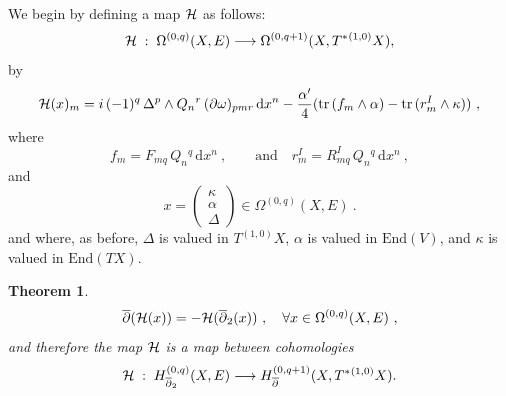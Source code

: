 \documentclass[12pt,a4paper]{article}
\def\bar#1{\overline{#1}}
\let\p=\partial
\def\a{\alpha'}
\def\d{\textrm{d}}
\def\End{\textrm{End}}
\def\bp{\bar{\partial}}
\def\tr{\textrm{tr}}
\newtheorem{Theorem}{Theorem}
\theoremstyle{definition}
\begin{document}
We begin by defining a map $\cal H$ as follows:
\begin{equation}
{\cal H}\;:\;\Omega^{(0,q)}(X, E)\longrightarrow\Omega^{(0,q+1)}(X, T^*{}^{(1,0)}X),\label{eq:mapH}
\end{equation}
by
\begin{equation}
{\cal H}(x)_m= i\, (-1)^q\, \Delta^p\wedge Q_{n}{}^r\,(\p\omega)_{pmr}\, \d x^n-\frac{\a}{4}(\tr\,(f_m\wedge \alpha)-\tr\,(r_m^I\wedge \kappa))~,\label{eq:Hdef}
\end{equation}
where
\[ f_m = F_{mq}\,Q_{n}{}^q\,\d x^n~, \qquad\text{and}\quad r_m^I = R^I_{mq}\, Q_{n}{}^q\,\d x^n~,\]
and 
\begin{equation*}
x=\left(
\begin{array}{c}
\kappa\\ \alpha\\ \Delta
\end{array}
\right)
\in\Omega^{(0,q)}(X,E)~.
\end{equation*} 
and where, as before, $\Delta$ is valued in $T^{(1,0)}X$,  $\alpha$ is valued in $\End(V)$, and $\kappa$ is valued in $\End(TX)$.

\begin{Theorem}\label{prop:five}
\begin{equation}
\bp({\cal H}(x)) = - {\cal H}(\bp_2(x))~,\quad\forall x\in \Omega^{(0,q)}(X,E)~, 
\label{eq:Hcohom} 
\end{equation}
and therefore the map $\cal H$ is a map between cohomologies
\begin{equation}
{\cal H}\;:\;H_{\bp_2}^{(0,q)}(X, E)\longrightarrow H_{\bp}^{(0,q+1)}(X, T^*{}^{(1,0)}X).\label{eq:mapHcohom}
\end{equation}
\end{Theorem}
\end{document}
